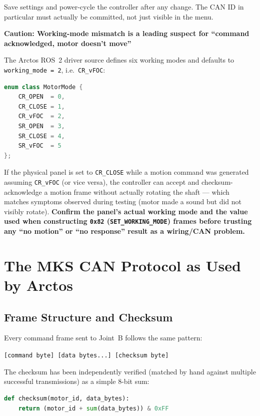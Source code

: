 \documentclass[11pt,letterpaper]{article}
\newenvironment{caution}[1]{%
    \par\addvspace{8pt}%
    \noindent{\color{cautionred}\rule{\linewidth}{0.8pt}}\par\vspace{2pt}
    \noindent\textbf{\color{cautionred}Caution: #1}\par\vspace{2pt}
}{%
    \par\vspace{2pt}\noindent{\color{cautionred}\rule{\linewidth}{0.4pt}}%
    \par\addvspace{8pt}%
}
\begin{document}
Save settings and power-cycle the controller after any change. The CAN ID in particular must actually be committed, not just visible in the menu.

\begin{caution}{Working-mode mismatch is a leading suspect for ``command acknowledged, motor doesn't move''}
The Arctos ROS~2 driver source defines six working modes and defaults to \texttt{working\_mode = 2}, i.e.\ \texttt{CR\_vFOC}:
\begin{lstlisting}[language=C++]
enum class MotorMode {
    CR_OPEN  = 0,
    CR_CLOSE = 1,
    CR_vFOC  = 2,
    SR_OPEN  = 3,
    SR_CLOSE = 4,
    SR_vFOC  = 5
};
\end{lstlisting}
If the physical panel is set to \texttt{CR\_CLOSE} while a motion command was generated assuming \texttt{CR\_vFOC} (or vice versa), the controller can accept and checksum-acknowledge a motion frame without actually rotating the shaft --- which matches symptoms observed during testing (motor made a sound but did not visibly rotate). \textbf{Confirm the panel's actual working mode and the value used when constructing \texttt{0x82} (\texttt{SET\_WORKING\_MODE}) frames before trusting any ``no motion'' or ``no response'' result as a wiring/CAN problem.}
\end{caution}

\newpage
\section{The MKS CAN Protocol as Used by Arctos}

\subsection{Frame Structure and Checksum}

Every command frame sent to Joint~B follows the same pattern:

\begin{center}
\texttt{[command byte] [data bytes...] [checksum byte]}
\end{center}

The checksum has been independently verified (matched by hand against multiple successful transmissions) as a simple 8-bit sum:

\begin{lstlisting}[language=python]
def checksum(motor_id, data_bytes):
    return (motor_id + sum(data_bytes)) & 0xFF
\end{lstlisting}
\end{document}
